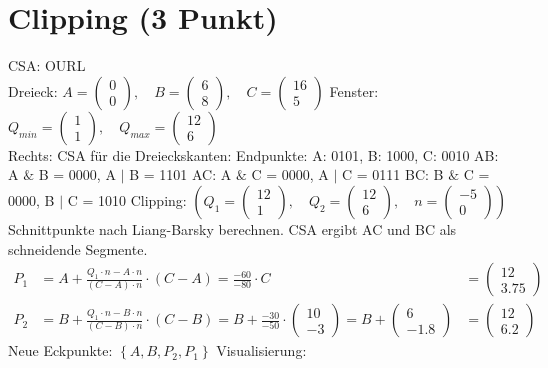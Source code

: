 \documentclass[a4paper,10pt,DIV=14]{article}
\begin{document}
\newcommand*\BitAnd{\mathrel{\&}}
\newcommand*\BitOr{\mathrel{|}}

\newcommand{\VecTwo}[2]{\begin{pmatrix} #1 \\ #2 \end{pmatrix}}

\newpage
\section{Clipping (3 Punkt)}
CSA: OURL \\[.3cm]
Dreieck: $A = \VecTwo{0}{0}, \quad B = \VecTwo{6}{8}, \quad C = \VecTwo{16}{5}$ \newline
Fenster: $Q_{min} = \VecTwo{1}{1}, \quad Q_{max} = \VecTwo{12}{6}$ \\[.5cm]
Rechts: \newline
CSA für die Dreieckskanten: \newline
Endpunkte: A: 0101, B: 1000, C: 0010 \newline
AB: A $\BitAnd$ B = 0000, A $\BitOr$ B = 1101 \newline
AC: A $\BitAnd$ C = 0000, A $\BitOr$ C = 0111 \newline
BC: B $\BitAnd$ C = 0000, B $\BitOr$ C = 1010 \newline
Clipping: $\left(Q_1= \VecTwo{12}{1}, \quad Q_2= \VecTwo{12}{6}, \quad n = \VecTwo{-5}{0} \right)$\newline
Schnittpunkte nach Liang-Barsky berechnen. CSA ergibt AC und BC als schneidende Segmente. \newline
\begin{align*}
P_1 &= A + \frac{Q_1 \cdot n - A \cdot n}{\left(C-A\right) \cdot n} \cdot \left(C-A\right) = \frac{-60}{-80} \cdot C &= \VecTwo{12}{3.75} \\
P_2 &= B + \frac{Q_1 \cdot n - B \cdot n}{\left(C-B\right) \cdot n} \cdot \left(C-B\right) = B + \frac{-30}{-50} \cdot \VecTwo{10}{-3} = B + \VecTwo{6}{-1.8} &= \VecTwo{12}{6.2}
\end{align*}
Neue Eckpunkte: $\left\lbrace A, B, P_2, P_1 \right\rbrace $ \newline
Visualisierung: \newline
\begin{center}
\end{center}
\end{document}
